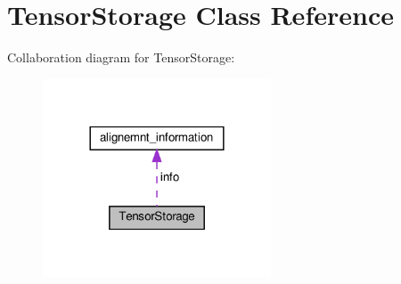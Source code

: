 \hypertarget{classTensorStorage}{}\section{Tensor\+Storage Class Reference}
\label{classTensorStorage}


Collaboration diagram for Tensor\+Storage\+:\nopagebreak
\begin{figure}[H]
\begin{center}
\leavevmode
\includegraphics[width=192pt]{classTensorStorage__coll__graph}
\end{center}
\end{figure}
